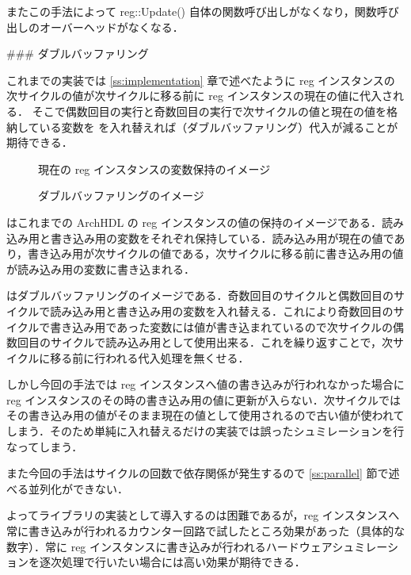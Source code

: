 またこの手法によって reg::Update() 自体の関数呼び出しがなくなり，関数呼び出しのオーバーヘッドがなくなる．


### ダブルバッファリング

これまでの実装では \ref{ss:implementation} 章で述べたように
reg インスタンスの次サイクルの値が次サイクルに移る前に reg インスタンスの現在の値に代入される．
そこで偶数回目の実行と奇数回目の実行で次サイクルの値と現在の値を格納している変数を
を入れ替えれば（ダブルバッファリング）代入が減ることが期待できる．

\begin{figure}[t]
 \begin{center}
  
 \end{center}
 \caption{現在の reg インスタンスの変数保持のイメージ}
 \label{fig:reg_curr_next}
\end{figure}

\begin{figure}[t]
 \begin{center}
  
 \end{center}
 \caption{ダブルバッファリングのイメージ}
 \label{fig:double_buffer}
\end{figure}

 はこれまでの ArchHDL の reg インスタンスの値の保持のイメージである．読み込み用と書き込み用の変数をそれぞれ保持している．読み込み用が現在の値であり，書き込み用が次サイクルの値である，次サイクルに移る前に書き込み用の値が読み込み用の変数に書き込まれる．

 はダブルバッファリングのイメージである．奇数回目のサイクルと偶数回目のサイクルで読み込み用と書き込み用の変数を入れ替える．これにより奇数回目のサイクルで書き込み用であった変数には値が書き込まれているので次サイクルの偶数回目のサイクルで読み込み用として使用出来る．これを繰り返すことで，次サイクルに移る前に行われる代入処理を無くせる．

しかし今回の手法では reg インスタンスへ値の書き込みが行われなかった場合に
reg インスタンスのその時の書き込み用の値に更新が入らない．次サイクルではその書き込み用の値がそのまま現在の値として使用されるので古い値が使われてしまう．そのため単純に入れ替えるだけの実装では誤ったシュミレーションを行なってしまう．

また今回の手法はサイクルの回数で依存関係が発生するので \ref{ss:parallel} 節で述べる並列化ができない．

よってライブラリの実装として導入するのは困難であるが，reg インスタンスへ常に書き込みが行われるカウンター回路で試したところ効果があった（具体的な数字）．常に reg インスタンスに書き込みが行われるハードウェアシュミレーションを逐次処理で行いたい場合には高い効果が期待できる．

